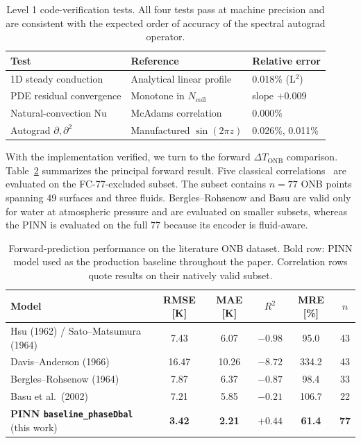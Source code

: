 \begin{table}[!htbp]
\centering
\caption{Level 1 code-verification tests. All four tests pass at machine
  precision and are consistent with the expected order of accuracy of the
  spectral autograd operator.}
\label{tab:level1}
\small
\begin{tabular}{lll}
\hline
Test & Reference & Relative error \\
\hline
1D steady conduction        & Analytical linear profile & 0.018\% (L$^2$) \\
PDE residual convergence    & Monotone in $N_{\mathrm{coll}}$ & slope $+0.009$ \\
Natural-convection Nu       & McAdams correlation & 0.000\% \\
Autograd $\partial,\partial^2$ & Manufactured $\sin(2\pi z)$ & 0.026\%, 0.011\% \\
\hline
\end{tabular}
\end{table}

With the implementation verified, we turn to the forward
$\Delta T_{\mathrm{ONB}}$ comparison.
Table~\ref{tab:forward} summarizes the principal forward result. Five
classical correlations~\citep{hsu1962,davis1966,bergles1964,sato1964,basu2002}
are evaluated on the FC-77-excluded subset. The subset contains $n=77$
ONB points spanning 49 surfaces and three fluids. Bergles--Rohsenow
and Basu are valid only for water at atmospheric pressure and are
evaluated on smaller subsets, whereas the PINN is evaluated on the
full 77 because its encoder is fluid-aware.

\begin{table}[!htbp]
\centering
\caption{Forward-prediction performance on the literature ONB dataset.
  Bold row: PINN model used as the production baseline throughout the paper.
  Correlation rows quote results on their natively valid subset.}
\label{tab:forward}
\small
\begin{tabular}{lccccc}
\hline
Model & RMSE [K] & MAE [K] & $R^2$ & MRE [\%] & $n$ \\
\hline
Hsu (1962) / Sato--Matsumura (1964) & 7.43  & 6.07  & $-0.98$  & 95.0  & 43 \\
Davis--Anderson (1966)              & 16.47 & 10.26 & $-8.72$  & 334.2 & 43 \\
Bergles--Rohsenow (1964)            & 7.87  & 6.37  & $-0.87$  & 98.4  & 33 \\
Basu et al.\ (2002)                 & 7.21  & 5.85  & $-0.21$  & 106.7 & 22 \\
\textbf{PINN \texttt{baseline\_phaseDbal}} (this work)
                                    & \textbf{3.42} & \textbf{2.21}
                                    & $\mathbf{+0.44}$ & \textbf{61.4} & \textbf{77} \\
\hline
\end{tabular}
\end{table}

